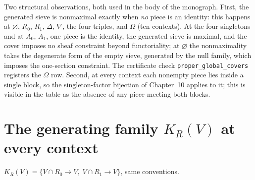 Two structural observations, both used in the body of the monograph.
First, the generated sieve is nonmaximal exactly when \emph{no} piece is
an identity: this happens at $\varnothing$, $R_0$, $R_1$, $\Delta$,
$\nabla$, the four triples, and $\Omega$ (ten contexts). At the four
singletons and at $A_0$, $A_1$, one piece is the identity, the generated
sieve is maximal, and the cover imposes no sheaf constraint beyond
functoriality; at $\varnothing$ the nonmaximality takes the degenerate
form of the empty sieve, generated by the null family, which imposes the
one-section constraint. The certificate check
\texttt{proper\_global\_covers} registers the $\Omega$ row. Second, at
every context each nonempty piece lies inside a single block, so the
singleton-factor bijection of Chapter~10 applies to it; this is visible in
the table as the absence of any piece meeting both blocks.

\section{The generating family $K_R(V)$ at every context}
\label{appA:sec:kr}

$K_R(V) = \{ V \cap R_0 \to V,\; V \cap R_1 \to V \}$, same conventions.

